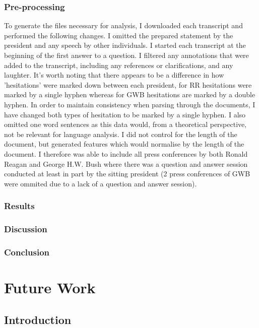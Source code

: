 \documentclass{article}
\begin{document}
\subsubsection{Pre-processing}
To generate the files necessary for analysis, I downloaded each transcript and performed the following changes. I omitted the prepared statement by the president and any speech by other individuals. I started each transcript at the beginning of the first answer to a question. I filtered any annotations that were added to the transcript, including any references or clarifications, and any laughter. It's worth noting that there appears to be a difference in how 'hesitations' were marked down between each president, for RR hesitations were marked by a single hyphen whereas for GWB hesitations are marked by a double hyphen. In order to maintain consistency when parsing through the documents, I have changed both types of hesitation to be marked by a single hyphen. I also omitted one word sentences as this data would, from a theoretical perspective, not be relevant for language analysis. I did not control for the length of the document, but generated features which would normalise by the length of the document. I therefore was able to include all press conferences by both Ronald Reagan and George H.W. Bush where there was a question and answer session conducted at least in part by the sitting president (2 press conferences of GWB were ommited due to a lack of a question and answer session).
\subsubsection{Results}
\subsubsection{Discussion}
\subsubsection{Conclusion}



\section{Future Work}
\subsection{Introduction}
\end{document}
